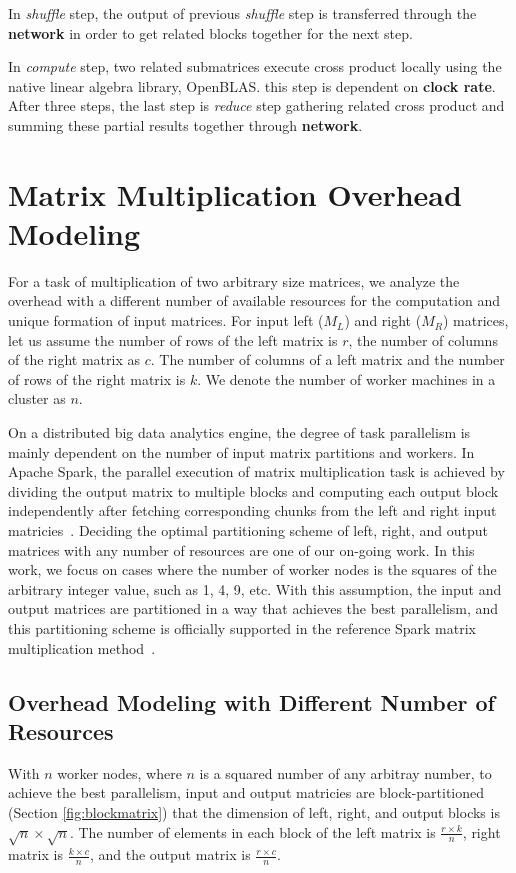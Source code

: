 \documentclass[10pt, conference, compsocconf]{IEEEtran}
\begin{document}
In \textit{shuffle} step, the output of previous \textit{shuffle} step is transferred through the \textbf{network} in order to get related blocks together for the next step.

In \textit{compute} step, two related submatrices execute cross product locally using the native linear algebra library, OpenBLAS. this step is dependent on \textbf{clock rate}. After three steps, the last step is \textit{reduce} step gathering related cross product and summing these partial results together through \textbf{network}.

\section{Matrix Multiplication Overhead Modeling}
For a task of multiplication of two arbitrary size matrices, we analyze the overhead with a different number of available resources for the computation and unique formation of input matrices. For input left ($M_L$) and right ($M_R$) matrices, let us assume the number of rows of the left matrix is $r$, the number of columns of the right matrix as $c$. The number of columns of a left matrix and the number of rows of the right matrix is $k$. We denote the number of worker machines in a cluster as $n$.

On a distributed big data analytics engine, the degree of task parallelism is mainly dependent on the number of input matrix partitions and workers. In Apache Spark, the parallel execution of matrix multiplication task is achieved by dividing the output matrix to multiple blocks and computing each output block independently after fetching corresponding chunks from the left and right input matricies~\cite{spark-mm}. Deciding the optimal partitioning scheme of left, right, and output matrices with any number of resources are one of our on-going work. In this work, we focus on cases where the number of worker nodes is the squares of the arbitrary integer value, such as 1, 4, 9, etc. With this assumption, the input and output matrices are partitioned in a way that achieves the best parallelism, and this partitioning scheme is officially supported in the reference Spark matrix multiplication method~\cite{spark-mm-code}.

\subsection{Overhead Modeling with Different Number of Resources}\label{sec:overhead-number-of-nodes}
With $n$ worker nodes, where $n$ is a squared number of any arbitray number, to achieve the best parallelism, input and output matricies are block-partitioned (Section \ref{fig:blockmatrix}) that the dimension of left, right, and output blocks is $\sqrt{n} \times \sqrt{n}$. The number of elements in each block of the left matrix is $\frac{r \times k}{n}$, right matrix is $\frac{k \times c}{n}$, and the output matrix is $\frac{r \times c}{n}$.
\end{document}
